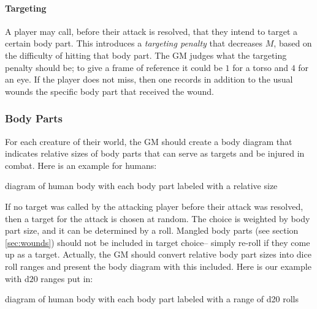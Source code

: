 \documentclass[12pt]{article}
\newcommand{\notes}[1]{{\color{Tan} #1}}
\newcommand{\emdex}[1]{\emph{#1}\index{#1}}
\begin{document}
\paragraph{Targeting}
A player may call, before their attack is resolved, that they intend to target a certain body part.
This introduces a \emdex{targeting penalty} that decreases $M$, based on the difficulty of hitting that body part.
The GM judges what the targeting penalty should be;
to give a frame of reference it could be $1$ for a torso and $4$ for an eye.
If the player does not miss, then one records in addition to the usual wounds the specific body part that received the wound.


\subsubsection{Body Parts}\label{sec:bodyparts}

For each creature of their world, the GM should create a body diagram
that indicates relative sizes of body
parts that can serve as targets and be injured in combat.
Here is an example for humans:

\notes{diagram of human body with each body part labeled with a relative size}

If no target was called by the attacking player before their attack was resolved, then a target
for the attack is chosen at random. The choice is weighted by body part size,
and it can be determined by a roll.
Mangled body parts (see section \ref{sec:wounds}) should not be included in target choice--
simply re-roll if they come up as a target.
Actually, the GM should convert relative body part sizes into dice roll ranges
and present the body diagram with this included.
Here is our example with d$20$ ranges put in:

\notes{diagram of human body with each body part labeled with a range of d20 rolls}
\end{document}
